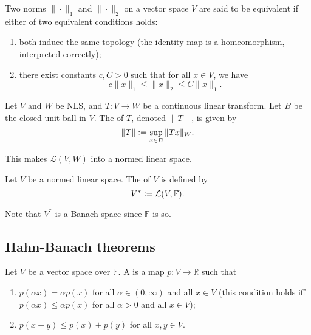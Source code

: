 \documentclass[12pt]{article}	%
\begin{document}
\begin{defn}
	Two norms $\|\cdot\|_{1}$ and $\|\cdot\|_{2}$ on a vector space $V$ are said to be equivalent if either of two equivalent conditions holds:
	\begin{enumerate}
		\item both induce the same topology (the identity map is a homeomorphism, interpreted correctly);
		\item there exist constants $c, C > 0$ such that for all $x \in V$, we have
		\begin{equation*} 
			c \|x\|_{1} \le \|x\|_{2} \le C \|x\|_{1}.
		\end{equation*}
	\end{enumerate}
\end{defn}

\begin{defn}
	Let $V$ and $W$ be NLS, and $T : V \to W$ be a continuous linear transform. Let $B$ be the closed unit ball in $V$. The  of $T$, denoted $\|T\|$, is given by
	\begin{equation*} 
		\|T\| \vcentcolon= \sup_{x \in B} \|T x\|_{W}.
	\end{equation*}
\end{defn}
This makes $\mathcal{L}(V, W)$ into a normed linear space.

\begin{defn}
	Let $V$ be a normed linear space. The  of $V$ is defined by
	\begin{equation*} 
		V^{\ast} \vcentcolon= \mathcal{L}(V, \mathbb{F}).
	\end{equation*}
\end{defn}
Note that $V^{\ast}$ is a Banach space since $\mathbb{F}$ is so.

\subsection{Hahn-Banach theorems}

\begin{defn}
	Let $V$ be a vector space over $\mathbb{F}$. A  is a map $p : V \to \mathbb{R}$ such that
	\begin{enumerate}
		\item $p(\alpha x) = \alpha p(x)$ for all $\alpha \in (0, \infty)$ and all $x \in V$ \newline
		(this condition holds iff $p(\alpha x) \le \alpha p(x)$ for all $\alpha > 0$ and all $x \in V$);
		\item $p(x + y) \le p(x) + p(y)$ for all $x, y \in V$.
	\end{enumerate}
\end{defn}
\end{document}
